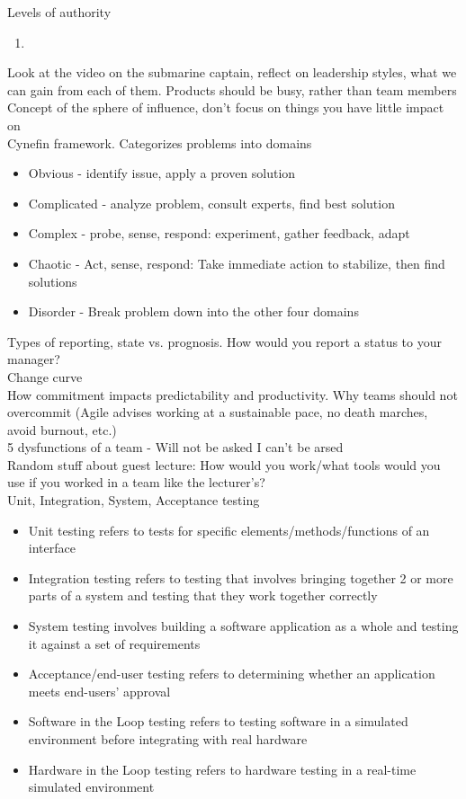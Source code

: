 \documentclass[10pt]{article}
\begin{document}
Levels of authority
\begin{enumerate}
\item 
\end{enumerate}
Look at the video on the submarine captain, reflect on leadership styles, what we can gain from each of them. Products should be busy, rather than team members \\
Concept of the sphere of influence, don't focus on things you have little impact on\\
Cynefin framework. Categorizes problems into domains
\begin{itemize}
\item Obvious - identify issue, apply a proven solution
\item Complicated - analyze problem, consult experts, find best solution
\item Complex - probe, sense, respond: experiment, gather feedback, adapt
\item Chaotic - Act, sense, respond: Take immediate action to stabilize, then find solutions
\item Disorder - Break problem down into the other four domains
\end{itemize}
Types of reporting, state vs. prognosis. How would you report a status to your manager?\\
Change curve\\
How commitment impacts predictability and productivity. Why teams should not overcommit (Agile advises working at a sustainable pace, no death marches, avoid burnout, etc.)\\
5 dysfunctions of a team - Will not be asked I can't be arsed\\
Random stuff about guest lecture: How would you work/what tools would you use if you worked in a team like the lecturer's?\\
Unit, Integration, System, Acceptance testing
\begin{itemize}
\item Unit testing refers to tests for specific elements/methods/functions of an interface
\item Integration testing refers to testing that involves bringing together 2 or more parts of a system and testing that they work together correctly
\item System testing involves building a software application as a whole and testing it against a set of requirements
\item Acceptance/end-user testing refers to determining whether an application meets end-users' approval
\item Software in the Loop testing refers to testing software in a simulated environment before integrating with real hardware
\item Hardware in the Loop testing refers to hardware testing in a real-time simulated environment 
\end{itemize}
\end{document}
